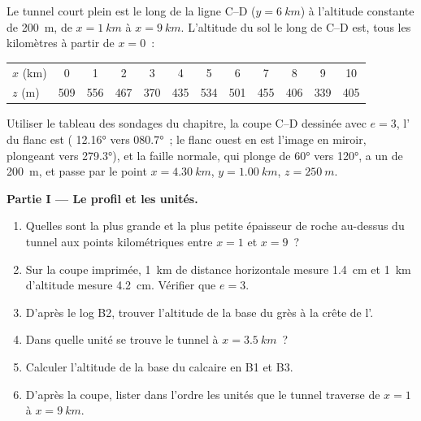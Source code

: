 \begin{problem}
\label{pb:b1:cross-sections:1}
Le tunnel court plein est le long de la ligne C--D ($y = \qty{6}{km}$) à
l'altitude constante de \qty{200}{m}, de $x = \qty{1}{km}$ à $x =
\qty{9}{km}$. L'altitude du sol le long de C--D est, tous les kilomètres à
partir de $x = 0$~:
\begin{center}
\small
\begin{tabular}{lccccccccccc}
\hline
$x$ (km) & 0 & 1 & 2 & 3 & 4 & 5 & 6 & 7 & 8 & 9 & 10 \\
$z$ (m) & 509 & 556 & 467 & 370 & 435 & 534 & 501 & 455 & 406 & 339 & 405 \\
\hline
\end{tabular}
\end{center}
Utiliser le tableau des sondages du chapitre, la coupe C--D dessinée avec
$e = 3$, l' du flanc est ( \ang{12.16} vers \ang{080.7}~; le flanc
ouest en est l'image en miroir, plongeant vers \ang{279.3}), et la faille
normale, qui plonge de \ang{60} vers \ang{120}, a un  de
\qty{200}{m}, et passe par le point $x = \qty{4.30}{km}$, $y = \qty{1.00}{km}$,
$z = \qty{250}{m}$.

\medskip
\noindent\textbf{Partie I --- Le profil et les unités.}
\begin{enumerate}
  \item Quelles sont la plus grande et la plus petite épaisseur de roche
        au-dessus du tunnel aux points kilométriques entre $x = 1$ et $x = 9$~?
  \item Sur la coupe imprimée, \qty{1}{km} de distance horizontale mesure
        \qty{1.4}{cm} et \qty{1}{km} d'altitude mesure \qty{4.2}{cm}. Vérifier
        que $e = 3$.
  \item D'après le log B2, trouver l'altitude de la base du grès à la crête de
        l'.
  \item Dans quelle unité se trouve le tunnel à $x = \qty{3.5}{km}$~?
  \item Calculer l'altitude de la base du calcaire en B1 et B3.
  \item D'après la coupe, lister dans l'ordre les unités que le tunnel traverse
        de $x = 1$ à $x = \qty{9}{km}$.
\end{enumerate}


\end{problem}
